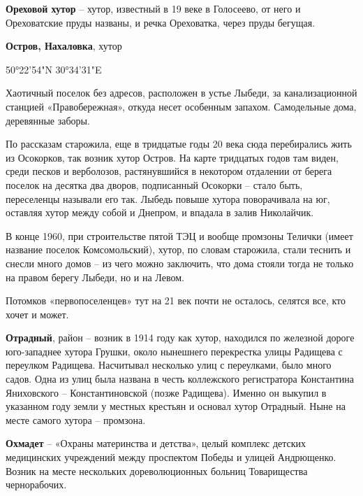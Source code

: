 \textbf{Ореховой хутор} – хутор, известный в 19 веке в Голосеево, от него и Ореховатские пруды названы, и речка Ореховатка, через пруды бегущая.\\

\medskip

\textbf{Остров, Нахаловка}, хутор

50°22'54"N 30°34'31"E

Хаотичный поселок без адресов, расположен в устье Лыбеди, за канализационной станцией «Правобережная», откуда несет особенным запахом. Самодельные дома, деревянные заборы.

По рассказам старожила, еще в тридцатые годы 20 века сюда перебирались жить из Осокорков, так возник хутор Остров. На карте тридцатых годов там виден, среди песков и верболозов, растянувшийся в некотором отдалении от берега поселок на десятка два дворов, подписанный Осокорки – стало быть, переселенцы называли его так. Лыбедь повыше хутора поворачивала на юг, оставляя хутор между собой и Днепром, и впадала в залив Николайчик. 

В конце 1960, при строительстве пятой ТЭЦ и вообще промзоны Телички (имеет название поселок Комсомольский), хутор, по словам старожила, стали теснить и снесли много домов – из чего можно заключить, что дома стояли тогда не только на правом берегу Лыбеди, но и на Левом.

Потомков «первопоселенцев» тут на 21 век почти не осталось, селятся все, кто хочет и может.\\

\medskip


\textbf{Отрадный}, район – возник в 1914 году как хутор, находился по железной дороге юго-западнее хутора Грушки, около нынешнего перекрестка улицы Радищева с переулком Радищева. Насчитывал несколько улиц с переулками, было много садов. Одна из улиц была названа в честь коллежского регистратора Константина Яниховского – Константиновской (позже Радищева). Именно он выкупил в указанном году земли у местных крестьян и основал хутор Отрадный. Ныне на месте самого хутора – промзона.\\


\medskip

\textbf{Охмадет} – «Охраны материнства и детства», целый комплекс детских медицинских учреждений между проспектом Победы и улицей Андрющенко. Возник на месте нескольких дореволюционных больниц Товарищества чернорабочих.\\


